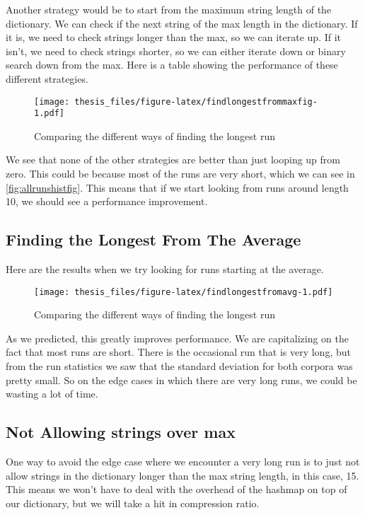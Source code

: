 \documentclass[12pt,twoside]{reedthesis}
\begin{document}
Another strategy would be to start from the maximum string length of the dictionary. We can check if the next string of the max length in the dictionary. If it is, we need to check strings longer than the max, so we can iterate up. If it isn't, we need to check strings shorter, so we can either iterate down or binary search down from the max. Here is a table showing the performance of these different strategies.
\begin{figure}
\centering
\texttt{[image: thesis\_files/figure-latex/findlongestfrommaxfig-1.pdf]}
\caption{\label{fig:findlongestfrommaxfig}Comparing the different ways of finding the longest run}
\end{figure}
We see that none of the other strategies are better than just looping up from zero. This could be because most of the runs are very short, which we can see in \ref{fig:allrunshistfig}. This means that if we start looking from runs around length 10, we should see a performance improvement.

\hypertarget{finding-the-longest-from-the-average}{%
\subsection{Finding the Longest From The Average}\label{finding-the-longest-from-the-average}}

Here are the results when we try looking for runs starting at the average.
\begin{figure}
\centering
\texttt{[image: thesis\_files/figure-latex/findlongestfromavg-1.pdf]}
\caption{\label{fig:findlongestfromavg}Comparing the different ways of finding the longest run}
\end{figure}
As we predicted, this greatly improves performance. We are capitalizing on the fact that most runs are short. There is the occasional run that is very long, but from the run statistics we saw that the standard deviation for both corpora was pretty small. So on the edge cases in which there are very long runs, we could be wasting a lot of time.

\hypertarget{not-allowing-strings-over-max}{%
\subsection{Not Allowing strings over max}\label{not-allowing-strings-over-max}}

One way to avoid the edge case where we encounter a very long run is to just not allow strings in the dictionary longer than the max string length, in this case, 15. This means we won't have to deal with the overhead of the hashmap on top of our dictionary, but we will take a hit in compression ratio.
\end{document}
